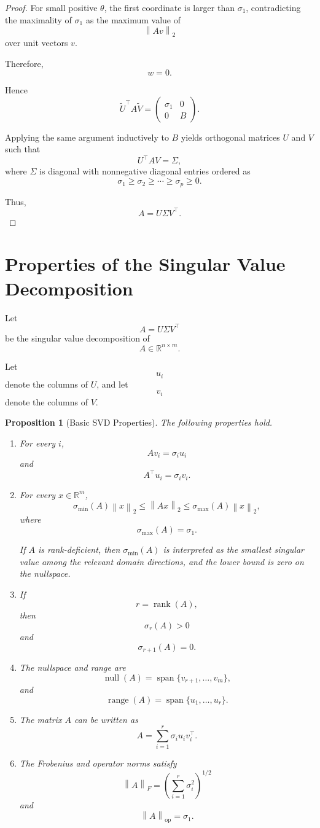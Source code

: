 \documentclass[12pt,oneside]{book}
\numberwithin{equation}{section}
\theoremstyle{definition}
\theoremstyle{plain}
\newtheorem{proposition}{Proposition}[section]
\theoremstyle{remark}
\newcommand{\R}{\mathbb{R}}
\newcommand{\norm}[1]{\left\lVert #1 \right\rVert}
\newcommand{\rank}{\operatorname{rank}}
\begin{document}
\begin{proof}
For small positive $\theta$, the first coordinate is larger than $\sigma_1$, contradicting the maximality of $\sigma_1$ as the maximum value of
\[
\norm{Av}_2
\]
over unit vectors $v$.

Therefore,
\[
w=0.
\]

Hence
\[
\widetilde{U}^\top A\widetilde{V}
=
\begin{pmatrix}
\sigma_1 & 0 \\
0 & B
\end{pmatrix}.
\]

Applying the same argument inductively to $B$ yields orthogonal matrices $U$ and $V$ such that
\[
U^\top A V=\Sigma,
\]
where $\Sigma$ is diagonal with nonnegative diagonal entries ordered as
\[
\sigma_1\geq \sigma_2\geq\cdots\geq\sigma_p\geq0.
\]

Thus,
\[
A=U\Sigma V^\top.
\]
\end{proof}

\section{Properties of the Singular Value Decomposition}

Let
\[
A=U\Sigma V^\top
\]
be the singular value decomposition of
\[
A\in\R^{n\times m}.
\]

Let
\[
u_i
\]
denote the columns of $U$, and let
\[
v_i
\]
denote the columns of $V$.

\begin{proposition}[Basic SVD Properties]
The following properties hold.

\begin{enumerate}
\item For every $i$,
\[
Av_i=\sigma_i u_i
\]
and
\[
A^\top u_i=\sigma_i v_i.
\]

\item For every $x\in\R^m$,
\[
\sigma_{\min}(A)\norm{x}_2
\leq
\norm{Ax}_2
\leq
\sigma_{\max}(A)\norm{x}_2,
\]
where
\[
\sigma_{\max}(A)=\sigma_1.
\]

If $A$ is rank-deficient, then $\sigma_{\min}(A)$ is interpreted as the smallest singular value among the relevant domain directions, and the lower bound is zero on the nullspace.

\item If
\[
r=\rank(A),
\]
then
\[
\sigma_r(A)>0
\]
and
\[
\sigma_{r+1}(A)=0.
\]

\item The nullspace and range are
\[
\operatorname{null}(A)
=
\operatorname{span}\{v_{r+1},\dots,v_m\},
\]
and
\[
\operatorname{range}(A)
=
\operatorname{span}\{u_1,\dots,u_r\}.
\]

\item The matrix $A$ can be written as
\[
A
=
\sum_{i=1}^r
\sigma_i u_i v_i^\top.
\]

\item The Frobenius and operator norms satisfy
\[
\norm{A}_F
=
\left(
\sum_{i=1}^r \sigma_i^2
\right)^{1/2}
\]
and
\[
\norm{A}_{\mathrm{op}}
=
\sigma_1.
\]
\end{enumerate}
\end{proposition}
\end{document}
